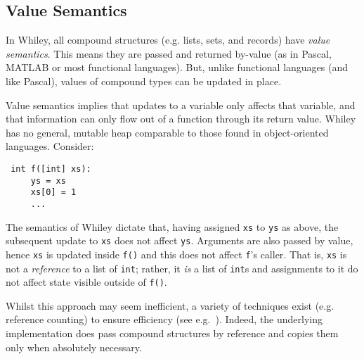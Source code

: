 \subsection{Value Semantics}
\label{value_semantics}
In Whiley, all compound structures (e.g. lists, sets, and records)
have {\em value semantics}.  This means they are passed and returned
by-value (as in Pascal, MATLAB or most functional languages).  But, unlike
functional languages (and like Pascal), values of compound types can
be updated in place.

Value semantics implies that updates to a variable only affects that
variable, and that information can only flow out of a function through
its return value.  Whiley has no general, mutable heap comparable to
those found in object-oriented languages.  Consider:
\begin{lstlisting}
 int f([int] xs):
     ys = xs
     xs[0] = 1
     ...
\end{lstlisting}
The semantics of Whiley dictate that, having assigned \lstinline{xs}
to \lstinline{ys} as above, the subsequent update to \lstinline{xs}
does not affect \lstinline{ys}.  Arguments are also passed by value,
hence \lstinline{xs} is updated inside \lstinline{f()} and this does
not affect \lstinline{f}'s caller.  That is, \lstinline{xs} is not a
{\em reference} to a list of \lstinline{int}; rather, it {\em is} a
list of \lstinline{int}s and assignments to it do not affect state
visible outside of \lstinline{f()}. 

Whilst this approach may seem inefficient, a variety of techniques
exist (e.g. reference counting) to ensure efficiency (see
e.g.~\cite{LH11,Shank01,Ode91}).  Indeed, the underlying
implementation does pass compound structures by reference and copies
them only when absolutely necessary.

